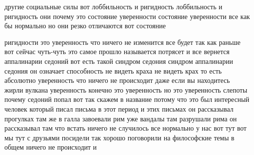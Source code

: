 другие социальные
силы вот лоббильность и ригидность лоббильность и ригидность они почему это
состояние уверенности состояние уверенности все как бы нормально но они резко
отличаются вот состояние 

ригидности это уверенность что ничего не изменится все
будет так как раньше вот сейчас чуть-чуть это самое прошло называется потрясет и
все вернется аппалинарии седоний вот есть такой синдром седония синдром
аппалинарии седония он означает способность не видеть краха не видеть крах то
есть абсолютно уверенность что ничего не происходит даже если вы находитесь
жирли вулкана уверенность конечно это уверенность но это уверенность слепоты
почему седоний попал вот так скажем в название потому что это был интересный
человек который писал письма в этот период и этих письмах он рассказывал
прогулках там же в галла завоевали рим уже вандалы там разрушали рима он
рассказывал там что встать ничего не случилось все нормально у нас вот тут вот
мы тут с друзьями посидели так хорошо поговорили на философские темы в общем
ничего не происходит и 


